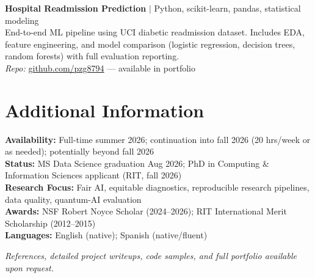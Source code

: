 \documentclass[10pt]{article}
\begin{document}
\vspace{4pt}
\textbf{Hospital Readmission Prediction} $|$ Python, scikit-learn, pandas, statistical modeling \\
End-to-end ML pipeline using UCI diabetic readmission dataset. Includes EDA, feature engineering, and model comparison (logistic regression, decision trees, random forests) with full evaluation reporting. \\
\textit{Repo:} \href{https://github.com/pzg8794}{github.com/pzg8794} --- available in portfolio


\section{Additional Information}

\textbf{Availability:} Full-time summer 2026; continuation into fall 2026 (20 hrs/week or as needed); potentially beyond fall 2026 \\
\textbf{Status:} MS Data Science graduation Aug 2026; PhD in Computing \& Information Sciences applicant (RIT, fall 2026) \\
\textbf{Research Focus:} Fair AI, equitable diagnostics, reproducible research pipelines, data quality, quantum-AI evaluation \\
\textbf{Awards:} NSF Robert Noyce Scholar (2024--2026); RIT International Merit Scholarship (2012--2015) \\
\textbf{Languages:} English (native); Spanish (native/fluent)

\vspace{8pt}
\small{\textit{References, detailed project writeups, code samples, and full portfolio available upon request.}}
\end{document}
